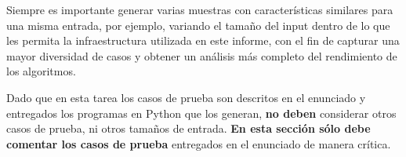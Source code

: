 
Siempre es importante generar varias muestras con características similares para una misma entrada, por ejemplo, variando el tamaño del input dentro de lo que les permita la infraestructura utilizada en este informe, con el fin de capturar una mayor diversidad de casos y obtener un análisis más completo del rendimiento de los algoritmos.
  
Dado que en esta tarea los casos de prueba son descritos en el enunciado y entregados los programas en Python que los generan, \textbf{no deben} considerar otros casos de prueba, ni otros tamaños de entrada. \textbf{En esta sección sólo debe comentar los casos de prueba} entregados en el enunciado de manera crítica.
